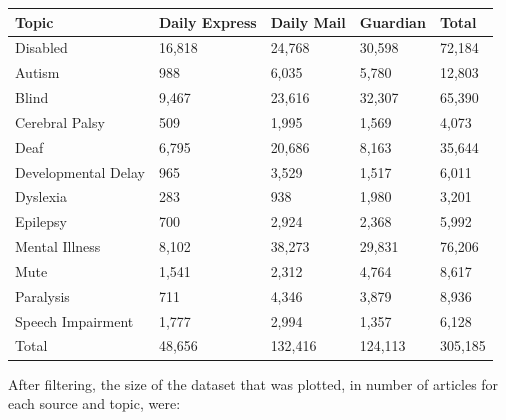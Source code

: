 \documentclass{report}
\begin{document}
\begin{center}
	\begin{tabu} to \textwidth { | X[c] | X[c] | X[c] | X[c] | X[c] | }
		\hline
		Topic & Daily Express & Daily Mail & Guardian & Total \\
		\hline
		Disabled & 16,818 & 24,768 & 30,598 & 72,184  \\
		\hline
		Autism & 988 & 6,035 & 5,780 & 12,803  \\
		\hline
		Blind & 9,467 & 23,616 & 32,307 & 65,390  \\
		\hline
		Cerebral Palsy & 509 & 1,995 & 1,569 & 4,073  \\
		\hline
		Deaf & 6,795 & 20,686 & 8,163 & 35,644  \\
		\hline
		Developmental Delay & 965 & 3,529 & 1,517 & 6,011  \\
		\hline
		Dyslexia & 283 & 938 & 1,980 & 3,201  \\
		\hline
		Epilepsy & 700 & 2,924 & 2,368 & 5,992  \\
		\hline
		Mental Illness & 8,102 & 38,273 & 29,831 & 76,206  \\
		\hline
		Mute & 1,541 & 2,312 & 4,764 & 8,617  \\
		\hline
		Paralysis & 711 & 4,346 & 3,879 & 8,936  \\
		\hline
		Speech Impairment & 1,777 & 2,994 & 1,357 & 6,128  \\
		\hline
		Total & 48,656 & 132,416 & 124,113 & 305,185  \\
		\hline
	\end{tabu}
\end{center}

After filtering, the size of the dataset that was plotted, in number of articles for each source and topic, were:
\end{document}
